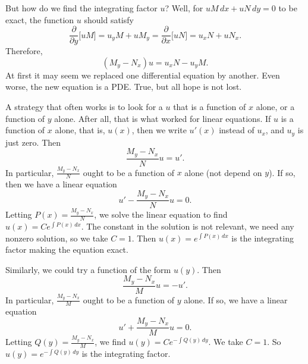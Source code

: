 But how do we find the integrating factor $u$?  Well, for
$uM \, dx + uN \, dy = 0$ to be exact,
the function $u$ should satisfy
\begin{equation*}
\frac{\partial}{\partial y} \bigl[ u M \bigr] = 
u_y M + u M_y = 
\frac{\partial}{\partial x} \bigl[ u N \bigr] = 
u_x N + u N_x .
\end{equation*}
Therefore,
\begin{equation*}
(M_y-N_x)u = u_x N - u_y M .
\end{equation*}
At first it may seem we replaced one differential equation by another.
Even worse, the new equation is a PDE\@.
True, but all hope is not lost.

A strategy that often works is to look for a $u$ that is a function
of $x$ alone, or a function of $y$ alone.
After all, that is what worked for linear equations.
If $u$ is a function of $x$
alone,
that is, $u(x)$, then we write $u'(x)$ instead of $u_x$, and $u_y$ is just
zero.
Then
\begin{equation*}
\frac{M_y-N_x}{N}u = u' .
\end{equation*}
In particular, $\frac{M_y-N_x}{N}$ ought to be a function of $x$ alone (not
depend on $y$).  If so, then we have a linear equation
\begin{equation*}
u' - \frac{M_y-N_x}{N} u = 0 .
\end{equation*}
Letting $P(x) = \frac{M_y-N_x}{N}$,
we solve the linear equation
to find $u(x) = C e^{\int P(x) \, dx}$.  The constant in the
solution is not relevant, we need any nonzero solution,
so we take $C=1$.
Then $u(x) = e^{\int P(x) \, dx}$ is the integrating factor
making the equation exact.

Similarly, we could try a function of the form $u(y)$.
Then
\begin{equation*}
\frac{M_y-N_x}{M} u = - u' .
\end{equation*}
In particular, $\frac{M_y-N_x}{M}$ ought to be a function of $y$ alone.
If so, we have a linear equation
\begin{equation*}
u' + \frac{M_y-N_x}{M} u = 0 .
\end{equation*}
Letting $Q(y) = \frac{M_y-N_x}{M}$,
we find $u(y) = C e^{-\int Q(y) \, dy}$.  We
take $C=1$.  So $u(y) = e^{-\int Q(y) \, dy}$ is the integrating factor.

